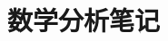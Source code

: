 \documentclass[b5paper]{ctexrep}
\begin{document}
\title{数学分析笔记}
\author{\Large \Caffein}
\date{}
\maketitle
\tableofcontents


\end{document}
